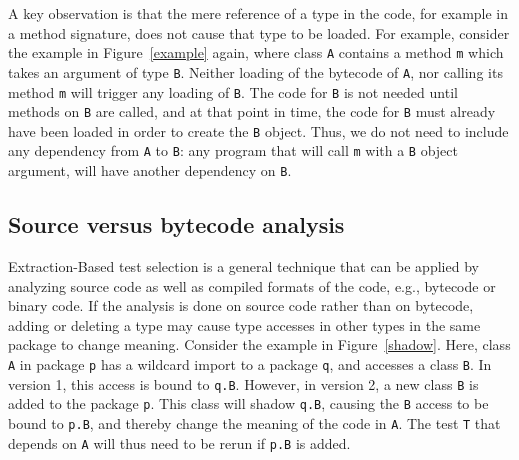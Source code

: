 {A key observation is that the mere reference of a type in the code, for example in a method signature, does not cause that type to be loaded. For example, consider the example in Figure~\ref{example} again, where class \texttt{A} contains a method \texttt{m} which takes an argument of type \texttt{B}. Neither loading of the bytecode of \texttt{A}, nor calling its method \texttt{m} will trigger any loading of \texttt{B}. The code for \texttt{B} is not needed until methods on \texttt{B} are called, and at that point in time, the code for \texttt{B} must already have been loaded in order to create the \texttt{B} object. Thus, we do not need to include any dependency from \texttt{A} to \texttt{B}: any program that will call \texttt{m} with a \texttt{B} object argument, will have another dependency on \texttt{B}.




\subsection{Source versus bytecode analysis}
\label{Shadowing}
Extraction-Based test selection is a general technique that can be applied by analyzing source code as well as compiled formats of the code, e.g., bytecode or binary code.
If the analysis is done on source code rather than on bytecode, adding or deleting a type may cause type accesses in other types in the same package to change meaning. Consider the example in Figure~\ref{shadow}.
Here, class \texttt{A} in package \texttt{p} has a wildcard import to a package \texttt{q}, and accesses a class \texttt{B}. In version 1, this access is bound to \texttt{q.B}. However, in version 2, a new class \texttt{B} is added to the package \texttt{p}. This class will shadow \texttt{q.B}, causing the \texttt{B} access to be bound to \texttt{p.B}, and thereby change the meaning of the code in \texttt{A}. The test \texttt{T} that depends on \texttt{A} will thus need to be rerun if \texttt{p.B} is added.

}
